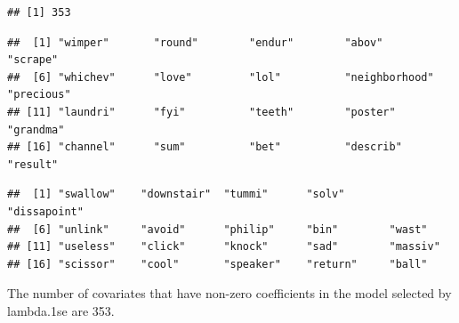 \documentclass[
]{article}
\newenvironment{Shaded}{\begin{snugshade}}{\end{snugshade}}
\newcommand{\AttributeTok}[1]{\textcolor[rgb]{0.77,0.63,0.00}{#1}}
\newcommand{\CommentTok}[1]{\textcolor[rgb]{0.56,0.35,0.01}{\textit{#1}}}
\newcommand{\DecValTok}[1]{\textcolor[rgb]{0.00,0.00,0.81}{#1}}
\newcommand{\FunctionTok}[1]{\textcolor[rgb]{0.00,0.00,0.00}{#1}}
\newcommand{\NormalTok}[1]{#1}
\newcommand{\OtherTok}[1]{\textcolor[rgb]{0.56,0.35,0.01}{#1}}
\newcommand{\SpecialCharTok}[1]{\textcolor[rgb]{0.00,0.00,0.00}{#1}}
\begin{document}
\begin{verbatim}
## [1] 353
\end{verbatim}

\begin{Shaded}
\end{Shaded}

\begin{verbatim}
##  [1] "wimper"       "round"        "endur"        "abov"         "scrape"      
##  [6] "whichev"      "love"         "lol"          "neighborhood" "precious"    
## [11] "laundri"      "fyi"          "teeth"        "poster"       "grandma"     
## [16] "channel"      "sum"          "bet"          "describ"      "result"
\end{verbatim}

\begin{Shaded}
\end{Shaded}

\begin{verbatim}
##  [1] "swallow"    "downstair"  "tummi"      "solv"       "dissapoint"
##  [6] "unlink"     "avoid"      "philip"     "bin"        "wast"      
## [11] "useless"    "click"      "knock"      "sad"        "massiv"    
## [16] "scissor"    "cool"       "speaker"    "return"     "ball"
\end{verbatim}

The number of covariates that have non-zero coefficients in the model
selected by lambda.1se are 353.
\end{document}
